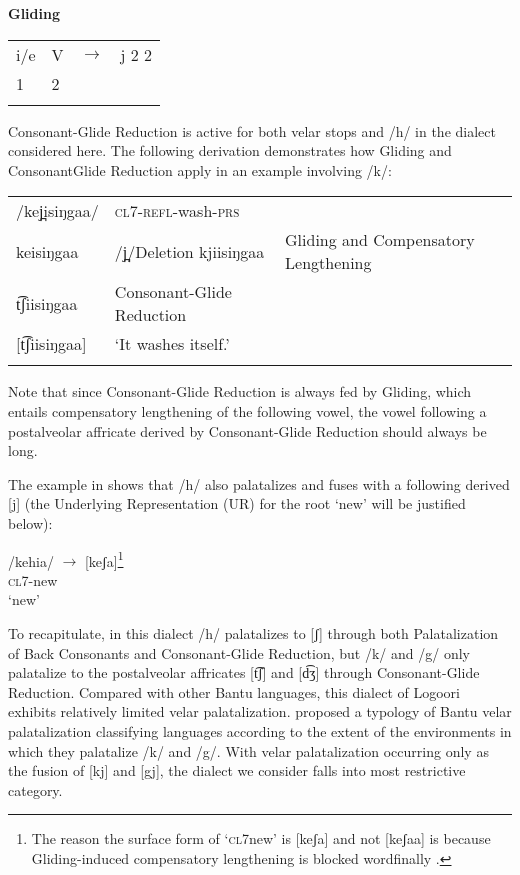 \documentclass[output=paper]{langsci/langscibook}
\begin{document}
\ea\label{ex:glewwe:8}{}
 \textbf{Gliding}\\{}
 \begin{tabular}{llll}
{i/e} & {V} & $\rightarrow$ & {j 2 2}\\{}
 {1} & {2} & & \\{}
 \end{tabular}
\z

Consonant-Glide Reduction is active for both velar stops and /h/ in the dialect considered here. The following derivation demonstrates how Gliding and ConsonantGlide Reduction apply in an example involving /k/:

\ea\label{ex:glewwe:9}{}
\begin{tabular}{ll}
/kej̪isiŋgaa/ & \textsc{cl7-refl}-wash-\textsc{prs}\\{} 
keisiŋgaa  &  /j̪/Deletion{\footnotemark}
{kjiisiŋgaa}  &  {Gliding and Compensatory Lengthening}\\{}
t͡ʃiisiŋgaa  &  Consonant-Glide Reduction\\{}
[t͡ʃiisiŋgaa] & ‘It washes itself.’\\{}
\end{tabular}
\z
{} 

Note that since Consonant-Glide Reduction is always fed by Gliding, which entails compensatory lengthening of the following vowel, the vowel following a postalveolar affricate derived by Consonant-Glide Reduction should always be long.

The example in  shows that /h/ also palatalizes and fuses with a following derived [j] (the Underlying Representation (UR) for the root ‘new’ will be justified below):


\ea\label{ex:glewwe:10}{}
/kehia/{\rmfnm} $\rightarrow$  [keʃa]\footnote{The reason the surface form of ‘\textsc{cl7}new’ is [keʃa] and not [keʃaa] is because Gliding-induced compensatory lengthening is blocked wordfinally \citep{Leung1991}.} \\{}
\textsc{cl7}-new\\{}
\glt ‘new’
\z
{}  



To recapitulate, in this dialect /h/ palatalizes to [ʃ] through both Palatalization of Back Consonants and Consonant-Glide Reduction, but /k/ and /g/ only palatalize to the postalveolar affricates [t͡ʃ] and [d͡ʒ] through Consonant-Glide Reduction. Compared with other Bantu languages, this dialect of Logoori exhibits relatively limited velar palatalization. \citet{HymanMoxley1996} proposed a typology of Bantu velar palatalization classifying languages according to the extent of the environments in which they palatalize /k/ and /g/. With velar palatalization occurring only as the fusion of [kj] and [gj], the dialect we consider falls into  most restrictive category. 
\end{document}

